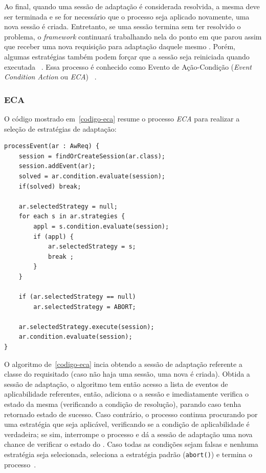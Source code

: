Ao final, quando uma sessão de adaptação é considerada resolvida, a mesma deve ser terminada e se for necessário que o processo seja aplicado novamente, uma nova sessão é criada. Entretanto, se uma sessão termina sem ter resolvido o problema, o \textit{framework} continuará trabalhando nela do ponto em que parou assim que receber uma nova requisição para adaptação daquele mesmo \awreq. Porém, algumas estratégias também podem forçar que a sessão seja reiniciada quando executada ~\cite{souza2013requirements}. Essa processo é conhecido como Evento de Ação-Condição (\textit{Event Condition Action} ou \textit{ECA}) ~\cite{morin2009models}.

\subsubsection{ECA}
\label{sec-referencial-zanshin-eca}

O código mostrado em~\ref{codigo-eca} resume o processo \textit{ECA} para realizar a seleção de estratégias de adaptação:

\begin{lstlisting}[caption={Código do processo ECA},label={codigo-eca}]
processEvent(ar : AwReq) {
	session = findOrCreateSession(ar.class);
	session.addEvent(ar);
	solved = ar.condition.evaluate(session);
	if(solved) break;

	ar.selectedStrategy = null;
	for each s in ar.strategies {
		appl = s.condition.evaluate(session);
		if (appl) {
			ar.selectedStrategy = s;
			break ;
		}
	}

	if (ar.selectedStrategy == null)
		ar.selectedStrategy = ABORT;

	ar.selectedStrategy.execute(session);
	ar.condition.evaluate(session);
}
\end{lstlisting}

O algoritmo de~\ref{codigo-eca} incia obtendo a sessão de adaptação referente a classe do \awreq requisitado (caso não haja uma sessão, uma nova é criada). Obtida a sessão de adaptação, o algoritmo tem então acesso a lista de eventos de aplicabilidade referentes, então, adiciona o \awreq a sessão e imediatamente verifica o estado da mesma (verificando a condição de resolução), parando caso tenha retornado estado de sucesso. Caso contrário, o processo continua procurando por uma estratégia que seja aplicável, verificando se a condição de aplicabilidade é verdadeira; se sim, interrompe o processo e dá a sessão de adaptação uma nova chance de verificar o estado do \awreq. Caso todas as condições sejam falsas e nenhuma estratégia seja selecionada, seleciona a estratégia padrão (\texttt{abort()}) e termina o processo~\cite{tesevitor}. 

